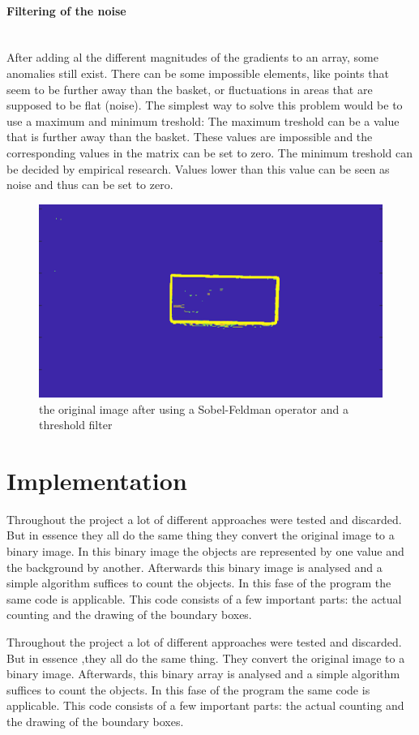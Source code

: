 \documentclass[11pt]{article}
\begin{document}
\paragraph{Filtering of the noise}\mbox{}\\
After adding al the different magnitudes of the gradients to an array, some anomalies still exist. There can be some impossible elements, like points that seem to be further away than the basket, or fluctuations in areas that are supposed to be flat (noise). The simplest way to solve this problem would be to use a maximum and minimum treshold: The maximum treshold can be a value that is further away than the basket. These values are impossible and the corresponding values in the matrix can be set to zero. The minimum treshold can be decided by empirical research. Values lower than this value can be seen as noise and thus can be set to zero.

\begin{figure}[h]
	\center
  \includegraphics[width=0.6\linewidth]{sobel_and_threshold.png}
  \caption{the original image after using a Sobel-Feldman operator and a threshold filter}
  \label{fig:Moore_Neighbor}
\end{figure}

\section{Implementation}
Throughout the project a lot of different approaches were tested and discarded. But in essence they all do the same thing they convert the original image to a binary image. In this binary image the objects are represented by one value and the background by another. Afterwards this binary image is analysed and a simple algorithm suffices to count the objects. In this fase of the program the same code is applicable. This code consists of a few important parts: the actual counting and the drawing of the boundary boxes. 

Throughout the project a lot of different approaches were tested and discarded. But in essence ,they all do the same thing. They convert the original image to a binary image. Afterwards, this binary array is analysed and a simple algorithm suffices to count the objects. In this fase of the program the same code is applicable. This code consists of a few important parts: the actual counting and the drawing of the boundary boxes. 
\end{document}
